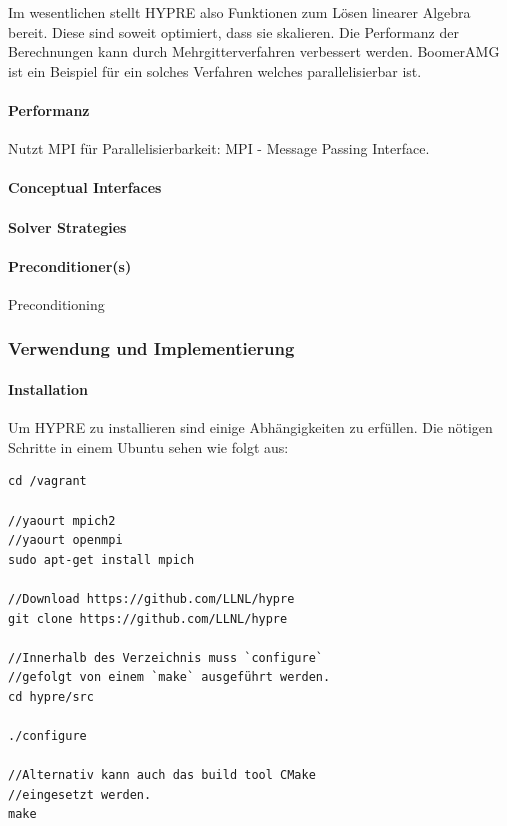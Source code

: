 \documentclass[a4paper,10pt]{article}
\begin{document}
Im wesentlichen stellt HYPRE also Funktionen zum Lösen linearer Algebra bereit.
Diese sind soweit optimiert, dass sie skalieren.
Die Performanz der Berechnungen kann durch Mehrgitterverfahren verbessert werden.
BoomerAMG ist ein Beispiel für ein solches Verfahren welches parallelisierbar ist.

\paragraph{Performanz}
Nutzt MPI für Parallelisierbarkeit: MPI - Message Passing Interface.


\paragraph{Conceptual Interfaces}
\paragraph{Solver Strategies}
\paragraph{Preconditioner(s)}

Preconditioning	\cite{FritzschePreconditioning}

\subsubsection{Verwendung und Implementierung}

\paragraph{Installation}
Um HYPRE zu installieren sind einige Abhängigkeiten zu erfüllen.
Die nötigen Schritte in einem Ubuntu sehen wie folgt aus:
\begin{lstlisting}[frame=single,caption=Installation HYPRE in Ubuntu]
cd /vagrant

//yaourt mpich2
//yaourt openmpi
sudo apt-get install mpich

//Download https://github.com/LLNL/hypre
git clone https://github.com/LLNL/hypre

//Innerhalb des Verzeichnis muss `configure` 
//gefolgt von einem `make` ausgeführt werden. 
cd hypre/src

./configure

//Alternativ kann auch das build tool CMake 
//eingesetzt werden.
make
\end{lstlisting}
\end{document}
